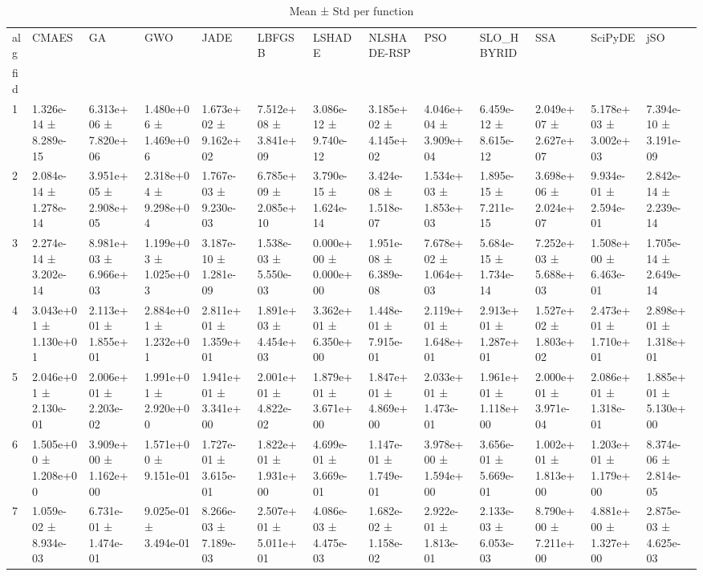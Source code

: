 \begin{table}
\caption{Mean ± Std per function}
\label{tab:meanstd_all}
\begin{tabular}{lllllllllllll}
\toprule
alg & CMAES & GA & GWO & JADE & LBFGSB & LSHADE & NLSHADE-RSP & PSO & SLO_HBYRID & SSA & SciPyDE & jSO \\
fid &  &  &  &  &  &  &  &  &  &  &  &  \\
\midrule
1 & 1.326e-14 ± 8.289e-15 & 6.313e+06 ± 7.820e+06 & 1.480e+06 ± 1.469e+06 & 1.673e+02 ± 9.162e+02 & 7.512e+08 ± 3.841e+09 & 3.086e-12 ± 9.740e-12 & 3.185e+02 ± 4.145e+02 & 4.046e+04 ± 3.909e+04 & 6.459e-12 ± 8.615e-12 & 2.049e+07 ± 2.627e+07 & 5.178e+03 ± 3.002e+03 & 7.394e-10 ± 3.191e-09 \\
2 & 2.084e-14 ± 1.278e-14 & 3.951e+05 ± 2.908e+05 & 2.318e+04 ± 9.298e+04 & 1.767e-03 ± 9.230e-03 & 6.785e+09 ± 2.085e+10 & 3.790e-15 ± 1.624e-14 & 3.424e-08 ± 1.518e-07 & 1.534e+03 ± 1.853e+03 & 1.895e-15 ± 7.211e-15 & 3.698e+06 ± 2.024e+07 & 9.934e-01 ± 2.594e-01 & 2.842e-14 ± 2.239e-14 \\
3 & 2.274e-14 ± 3.202e-14 & 8.981e+03 ± 6.966e+03 & 1.199e+03 ± 1.025e+03 & 3.187e-10 ± 1.281e-09 & 1.538e-03 ± 5.550e-03 & 0.000e+00 ± 0.000e+00 & 1.951e-08 ± 6.389e-08 & 7.678e+02 ± 1.064e+03 & 5.684e-15 ± 1.734e-14 & 7.252e+03 ± 5.688e+03 & 1.508e+00 ± 6.463e-01 & 1.705e-14 ± 2.649e-14 \\
4 & 3.043e+01 ± 1.130e+01 & 2.113e+01 ± 1.855e+01 & 2.884e+01 ± 1.232e+01 & 2.811e+01 ± 1.359e+01 & 1.891e+03 ± 4.454e+03 & 3.362e+01 ± 6.350e+00 & 1.448e-01 ± 7.915e-01 & 2.119e+01 ± 1.648e+01 & 2.913e+01 ± 1.287e+01 & 1.527e+02 ± 1.803e+02 & 2.473e+01 ± 1.710e+01 & 2.898e+01 ± 1.318e+01 \\
5 & 2.046e+01 ± 2.130e-01 & 2.006e+01 ± 2.203e-02 & 1.991e+01 ± 2.920e+00 & 1.941e+01 ± 3.341e+00 & 2.001e+01 ± 4.822e-02 & 1.879e+01 ± 3.671e+00 & 1.847e+01 ± 4.869e+00 & 2.033e+01 ± 1.473e-01 & 1.961e+01 ± 1.118e+00 & 2.000e+01 ± 3.971e-04 & 2.086e+01 ± 1.318e-01 & 1.885e+01 ± 5.130e+00 \\
6 & 1.505e+00 ± 1.208e+00 & 3.909e+00 ± 1.162e+00 & 1.571e+00 ± 9.151e-01 & 1.727e-01 ± 3.615e-01 & 1.822e+01 ± 1.931e+00 & 4.699e-01 ± 3.669e-01 & 1.147e-01 ± 1.749e-01 & 3.978e+00 ± 1.594e+00 & 3.656e-01 ± 5.669e-01 & 1.002e+01 ± 1.813e+00 & 1.203e+01 ± 1.179e+00 & 8.374e-06 ± 2.814e-05 \\
7 & 1.059e-02 ± 8.934e-03 & 6.731e-01 ± 1.474e-01 & 9.025e-01 ± 3.494e-01 & 8.266e-03 ± 7.189e-03 & 2.507e+01 ± 5.011e+01 & 4.086e-03 ± 4.475e-03 & 1.682e-02 ± 1.158e-02 & 2.922e-01 ± 1.813e-01 & 2.133e-03 ± 6.053e-03 & 8.790e+00 ± 7.211e+00 & 4.881e+00 ± 1.327e+00 & 2.875e-03 ± 4.625e-03 \\

\end{tabular}
\end{table}
